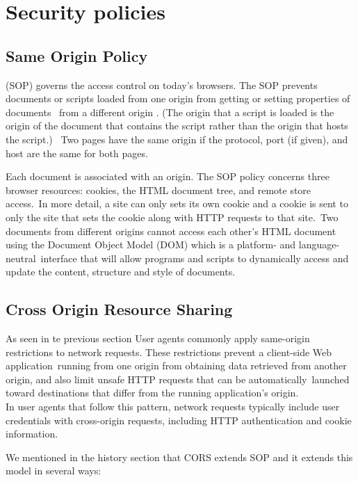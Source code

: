 \section{Security policies}

\subsection{Same Origin Policy}

\label{label:SOP}
(SOP) governs the access control on today’s browsers. The SOP prevents documents or scripts loaded from one origin from getting or setting properties of documents \
from a different origin . (The origin that a script is loaded is the origin of the document that contains the script rather than the origin that hosts the script.) \
Two pages have the same origin if the protocol, port (if given), and host are the same for both pages.

Each document is associated with an origin. The SOP policy concerns three browser resources: cookies, the HTML document tree, and remote store access.\
In more detail, a site can only sets its own cookie and a cookie is sent to only the site that sets the cookie along with HTTP requests to that site.\
Two documents from different origins cannot access each other’s HTML document using the Document Object Model (DOM) which is a platform- and language-neutral\
interface that will allow programs and scripts to dynamically access and update the content, structure and style of documents.\\


\subsection{Cross Origin Resource Sharing}
\label{label:CORS}

As seen in te previous section User agents commonly apply same-origin restrictions to network requests. These restrictions prevent a client-side Web application\
running from one origin from obtaining data retrieved from another origin, and also limit unsafe HTTP requests that can be automatically\
launched toward destinations that differ from the running application's origin.\\

In user agents that follow this pattern, network requests typically include user credentials with cross-origin requests, including HTTP authentication and cookie information.

We mentioned in the history section that CORS extends SOP and it extends this model in several ways:

